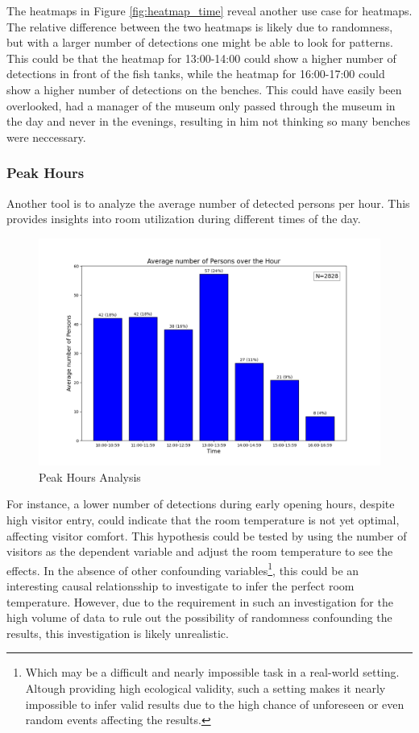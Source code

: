 The heatmaps in Figure \ref{fig:heatmap_time} reveal another use case for heatmaps. The relative difference between the two heatmaps is likely due to randomness, but with a larger number of detections one might be able to look for patterns. This could be that the heatmap for 13:00-14:00 could show a higher number of detections in front of the fish tanks, while the heatmap for 16:00-17:00 could show a higher number of detections on the benches. This could have easily been overlooked, had a manager of the museum only passed through the museum in the day and never in the evenings, resulting in him not thinking so many benches were neccessary. 


\subsubsection{Peak Hours}
\label{sec:peak_hours}
Another tool is to analyze the average number of detected persons per hour. This provides insights into room utilization during different times of the day.

\begin{figure}[H]
	\centering
	\includegraphics[width=1\textwidth]{Images/Analytics/peak_hours.png}
	\caption{Peak Hours Analysis}
    \label{fig:peak_hours}
\end{figure}

For instance, a lower number of detections during early opening hours, despite high visitor entry, could indicate that the room temperature is not yet optimal, affecting visitor comfort. This hypothesis could be tested by using the number of visitors as the dependent variable and adjust the room temperature to see the effects. In the absence of other confounding variables\footnote{Which may be a difficult and nearly impossible task in a real-world setting. Altough providing high ecological validity, such a setting makes it nearly impossible to infer valid results due to the high chance of unforeseen or even random events affecting the results.}, this could be an interesting causal relationsship to investigate to infer the perfect room temperature. However, due to the requirement in such an investigation for the high volume of data to rule out the possibility of randomness confounding the results, this investigation is likely unrealistic.

